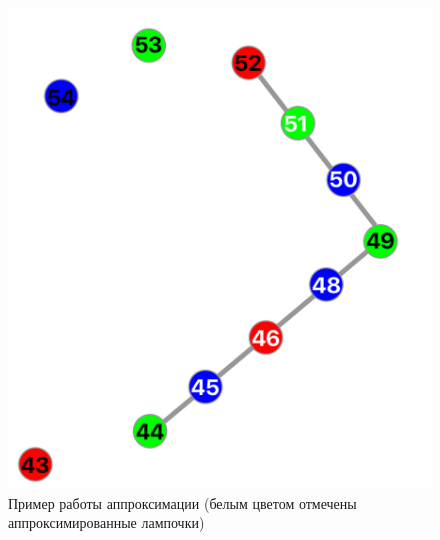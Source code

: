 ~
\begin{figure}[H]
\centering
	\includegraphics[scale=0.35]{figures/calibration_approximation.png}
	\caption{Пример работы аппроксимации (белым цветом отмечены аппроксимированные лампочки)}
	\label{fig:develop:algorithm:approximation}
\end{figure}